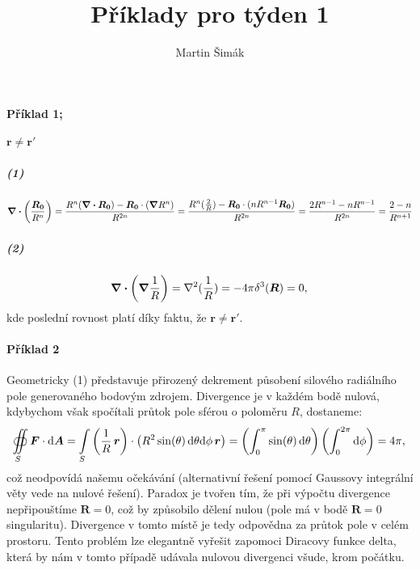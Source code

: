 \documentclass{article}
\title{Příklady pro týden 1}
\author{Martin Šimák}
\date{}
\newcommand{\vecvar}[1]{\bm{#1}}
\begin{document}
	\maketitle{}
	
	\paragraph{Příklad 1;} $\vecvar{r} \neq \vecvar{r'}$\\
	
	\subparagraph{(1)} \[
	\div\left(\frac{\vecvar{R_0}}{R^n}\right)
	= \frac{R^n (\div\vecvar{R_0}) - \vecvar{R_0} \cdot (\grad R^n)}{R^{2n}}
	= \frac{R^n (\frac{2}{R}) - \vecvar{R_0} \cdot (nR^{n-1} \vecvar{R_0})}{R^{2n}} = \frac{2R^{n-1} - nR^{n-1}}{R^{2n}}
	= \frac{2 - n}{R^{n + 1}}
	\]

	\subparagraph{(2)} \[
	\div{\left( \grad{\frac{1}{R}} \right)}
	= \nabla^2(\frac{1}{R})
	= -4 \pi \delta^3 (\vecvar{R})
	= 0, \\
	\]
	kde poslední rovnost platí díky faktu, že $\vecvar{r} \neq \vecvar{r'}$.
	\newpage
	
	\paragraph{Příklad 2} Geometricky (1) představuje přirozený dekrement působení silového radiálního pole generovaného bodovým zdrojem. Divergence je v každém bodě nulová, kdybychom však spočítali průtok pole sférou o poloměru $R$, dostaneme:\\ \[
	\oiint \limits_{S} \vecvar{F} \cdot \mathrm{d}\vecvar{A}
	= \int \limits_{S} \left( \frac{1}{R} \, \vecvar{r} \right) \cdot \left( R^2 \sin(\theta) \, \mathrm{d}\theta \mathrm{d}\phi \, \vecvar{r} \right)
	= \left( \int_{0}^{\pi} \sin(\theta) \, \mathrm{d}\theta \right) \left( \int_{0}^{2\pi} \mathrm{d}\phi \right)
	= 4\pi, \\
	\]
	což neodpovídá našemu očekávání (alternativní řešení pomocí Gaussovy integrální věty vede na nulové řešení). Paradox je tvořen tím, že při výpočtu divergence nepřipouštíme $\vecvar{R} = 0$, což by způsobilo dělení nulou (pole má v bodě $\vecvar{R} = 0$ singularitu). Divergence v tomto místě je tedy odpovědna za průtok pole v celém prostoru.
	Tento problém lze elegantně vyřešit zapomoci Diracovy funkce delta, která by nám v tomto případě udávala nulovou divergenci všude, krom počátku.
	
	
\end{document}
